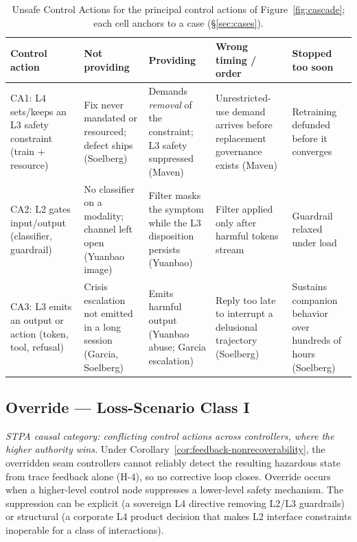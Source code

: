 \begin{table}[!htbp]
\centering
\small
\caption{Unsafe Control Actions for the principal control actions of Figure~\ref{fig:cascade}; each cell anchors to a case (\S\ref{sec:cases}).}
\label{tab:uca}
{\setlength{\tabcolsep}{3pt}
\begin{tabularx}{\columnwidth}{@{}P{2.2cm} Y Y Y Y@{}}
\toprule
\textbf{Control action} & \textbf{Not providing} & \textbf{Providing} & \textbf{Wrong timing / order} & \textbf{Stopped too soon} \\
\midrule
CA1: L4 sets/keeps an L3 safety constraint (train + resource) & Fix never mandated or resourced; defect ships (Soelberg) & Demands \emph{removal} of the constraint; L3 safety suppressed (Maven) & Unrestricted-use demand arrives before replacement governance exists (Maven) & Retraining defunded before it converges \\
CA2: L2 gates input/output (classifier, guardrail) & No classifier on a modality; channel left open (Yuanbao image) & Filter masks the symptom while the L3 disposition persists (Yuanbao) & Filter applied only after harmful tokens stream & Guardrail relaxed under load \\
CA3: L3 emits an output or action (token, tool, refusal) & Crisis escalation not emitted in a long session (Garcia, Soelberg) & Emits harmful output (Yuanbao abuse; Garcia escalation) & Reply too late to interrupt a delusional trajectory (Soelberg) & Sustains companion behavior over hundreds of hours (Soelberg) \\
\bottomrule
\end{tabularx}}
\end{table}

\subsection{Override --- Loss-Scenario Class I}

\emph{STPA causal category: conflicting control actions across controllers, where the higher authority wins.} Under Corollary~\ref{cor:feedback-nonrecoverability}, the overridden seam controllers cannot reliably detect the resulting hazardous state from trace feedback alone (H-4), so no corrective loop closes. Override occurs when a higher-level control node suppresses a lower-level safety mechanism. The suppression can be explicit (a sovereign L4 directive removing L2/L3 guardrails) or structural (a corporate L4 product decision that makes L2 interface constraints inoperable for a class of interactions).

